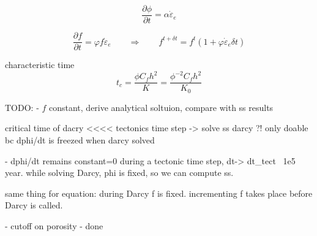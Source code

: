 \[
\frac{\partial \phi}{\partial t} = \alpha \dot{\varepsilon}_e
\]

\[
\frac{\partial f}{\partial t} = \varphi f \dot{\varepsilon}_e
\qquad
\Rightarrow
\qquad
f^{t+\delta t} = f^t (1 + \varphi  \dot{\varepsilon}_e \delta t)
\]


characteristic time
\[
t_c 
= \frac{\phi C_f h^2}{K} 
= \frac{\phi^{-2} C_f h^2}{K_0} 
\]


TODO:
- $f$ constant, derive analytical soltuion, compare with ss results

critical time of dacry <<<< tectonics time step   -> solve ss darcy ?! only doable bc dphi/dt is freezed when darcy solved

- dphi/dt remains constant=0 during a tectonic time step, dt-> dt_tect ~1e5 year. while solving Darcy, phi is fixed, so we can compute ss.

same thing for  equation: during Darcy f is fixed. incrementing f takes place before Darcy is called.  

- cutoff on porosity - done


